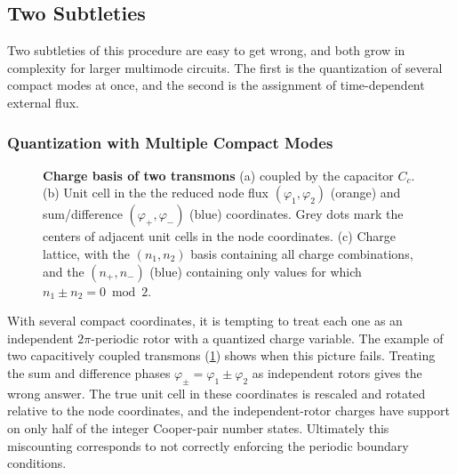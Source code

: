 \subsection{Two Subtleties}\label{sec:subtleties}

Two subtleties of this procedure are easy to get wrong, and both grow in complexity for larger multimode circuits.
The first is the quantization of several compact modes at once, and the second is the assignment of time-dependent external flux.

\subsubsection{Quantization with Multiple Compact Modes}\label{sec:multicompact}

\begin{figure}[t]
    \centering
    
    \caption{{\bf Charge basis of two transmons} (a) coupled by the capacitor $C_c$.
    (b) Unit cell in the the reduced node flux $(\varphi_{1},\varphi_{2})$ (orange) and sum/difference $(\varphi_+, \varphi_-)$ (blue) coordinates. Grey dots mark the centers of adjacent unit cells in the node coordinates.
    (c) Charge lattice, with the $(n_1, n_2)$ basis containing all charge combinations, and the $(n_+,n_-)$ (blue) containing only values for which $n_1\pm n_2 = 0 \bmod 2$.
    }
    \label{fig:two_transmon}
\end{figure}

With several compact coordinates, it is tempting to treat each one as an independent $2\pi$-periodic rotor with a quantized charge variable.
The example of two capacitively coupled transmons (\cref{fig:two_transmon}) shows when this picture fails.
Treating the sum and difference phases $\varphi_\pm=\varphi_1\pm\varphi_2$ as independent rotors gives the wrong answer.
The true unit cell in these coordinates is rescaled and rotated relative to the node coordinates, and the independent-rotor charges have support on only half of the integer Cooper-pair number states.
Ultimately this miscounting corresponds to not correctly enforcing the periodic boundary conditions.

